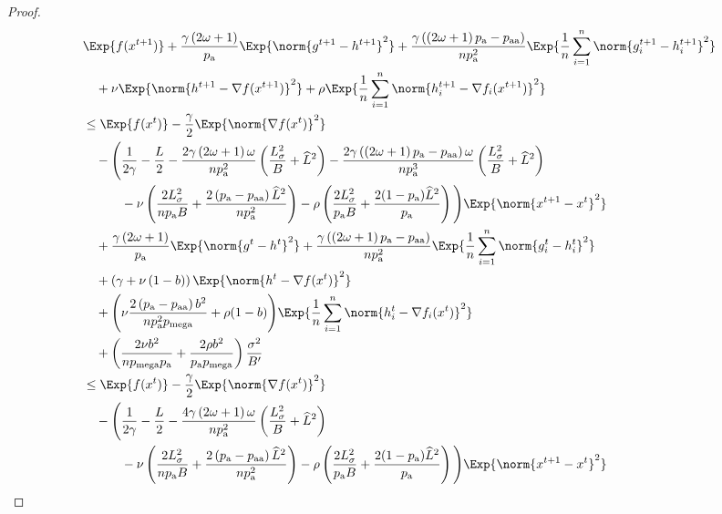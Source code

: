 \documentclass{article}
\newcommand*{\probavailable}{\ensuremath{p_{\textnormal{a}}}}
\newcommand*{\probpairaa}{\ensuremath{p_{\textnormal{aa}}}}
\newcommand*{\probmega}{\ensuremath{p_{\text{mega}}}}
\begin{document}
\begin{proof}
  \begin{align*}
    &\Exp{f(x^{t + 1})} + \frac{\gamma \left(2 \omega + 1\right)}{\probavailable} \Exp{\norm{g^{t+1} - h^{t+1}}^2} + \frac{\gamma\left(\left(2 \omega + 1\right)\probavailable - \probpairaa\right)}{n \probavailable^2} \Exp{\frac{1}{n}\sum_{i=1}^n\norm{g^{t+1}_i - h^{t+1}_i}^2}\\
    &\quad  + \nu \Exp{\norm{h^{t+1} - \nabla f(x^{t+1})}^2} + \rho \Exp{\frac{1}{n}\sum_{i=1}^n\norm{h^{t+1}_i - \nabla f_i(x^{t+1})}^2}\\
    &\leq \Exp{f(x^t)} - \frac{\gamma}{2}\Exp{\norm{\nabla f(x^t)}^2} \\
    &\quad - \Bigg(\frac{1}{2\gamma} - \frac{L}{2} - \frac{2 \gamma \left(2\omega + 1\right) \omega}{n \probavailable^2}\left(\frac{L_{\sigma}^2}{B} + \widehat{L}^2\right) - \frac{2\gamma\left(\left(2 \omega + 1\right)\probavailable - \probpairaa\right)\omega}{n \probavailable^3} \left(\frac{L_{\sigma}^2}{B} + \widehat{L}^2\right) \\
    &\qquad\quad - \nu \left(\frac{2 L_{\sigma}^2}{n \probavailable B} + \frac{2\left(\probavailable - \probpairaa\right) \widehat{L}^2}{n \probavailable^2}\right) - \rho \left(\frac{2 L_{\sigma}^2}{\probavailable B} + \frac{2(1 - \probavailable) \widehat{L}^2}{\probavailable}\right)\Bigg) \Exp{\norm{x^{t+1} - x^t}^2} \\
    &\quad + \frac{\gamma \left(2 \omega + 1\right)}{\probavailable} \Exp{\norm{g^{t} - h^{t}}^2} + \frac{\gamma\left(\left(2 \omega + 1\right)\probavailable - \probpairaa\right)}{n \probavailable^2}\Exp{\frac{1}{n}\sum_{i=1}^n\norm{g^{t}_i - h^{t}_i}^2} \\
    &\quad + \left(\gamma + \nu \left(1 - b\right)\right) \Exp{\norm{h^{t} - \nabla f(x^{t})}^2} \\
    &\quad + \Bigg(\nu \frac{2\left(\probavailable - \probpairaa\right) b^2}{n \probavailable^2 \probmega} + \rho (1 - b)\Bigg)\Exp{\frac{1}{n}\sum_{i=1}^n\norm{h^{t}_i - \nabla f_i(x^{t})}^2} \\
    &\quad + \left(\frac{2 \nu b^2}{n \probmega \probavailable} + \frac{2 \rho b^2}{\probavailable \probmega}\right) \frac{\sigma^2}{B'} \\
    &\leq \Exp{f(x^t)} - \frac{\gamma}{2}\Exp{\norm{\nabla f(x^t)}^2} \\
    &\quad - \Bigg(\frac{1}{2\gamma} - \frac{L}{2} - \frac{4 \gamma \left(2\omega + 1\right) \omega}{n \probavailable^2}\left(\frac{L_{\sigma}^2}{B} + \widehat{L}^2\right) \\
    &\qquad\quad - \nu \left(\frac{2 L_{\sigma}^2}{n \probavailable B} + \frac{2\left(\probavailable - \probpairaa\right) \widehat{L}^2}{n \probavailable^2}\right) - \rho \left(\frac{2 L_{\sigma}^2}{\probavailable B} + \frac{2(1 - \probavailable) \widehat{L}^2}{\probavailable}\right)\Bigg) \Exp{\norm{x^{t+1} - x^t}^2} \\

\end{align*}
\end{proof}
\end{document}

